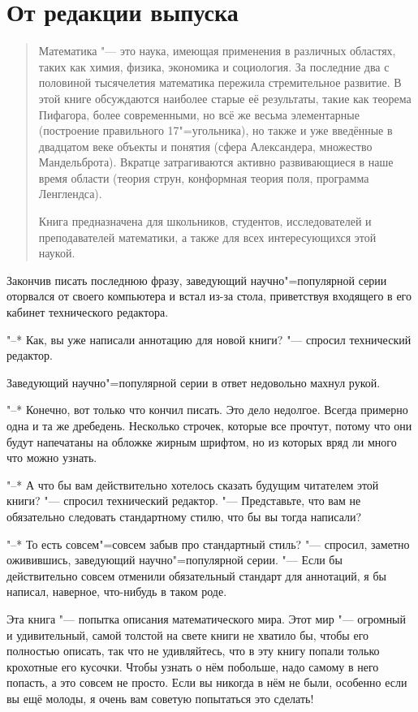 \chapter*{От редакции выпуска}

\begin{quotation}
Математика "--- это наука, имеющая применения в различных областях, таких как
химия, физика, экономика и социология.
За последние два с половиной тысячелетия математика пережила стремительное
развитие.
В этой книге обсуждаются наиболее старые её результаты, такие как теорема
Пифагора, более современными, но всё же весьма элементарные (построение
правильного 17"=угольника), но также и уже введённые в двадцатом веке объекты и
понятия (сфера Александера, множество Мандельброта).
Вкратце затрагиваются активно развивающиеся в наше время области (теория струн,
конформная теория поля, программа Ленглендса).

Книга предназначена для школьников, студентов, исследователей и преподавателей
математики, а также для всех интересующихся этой наукой.
\end{quotation}

Закончив писать последнюю фразу, заведующий научно"=популярной серии оторвался
от своего компьютера и встал из-за стола, приветствуя входящего в его кабинет
технического редактора.

"--* Как, вы уже написали аннотацию для новой книги? "--- спросил технический
редактор.

Заведующий научно"=популярной серии в ответ недовольно махнул рукой.

"--* Конечно, вот только что кончил писать.
Это дело недолгое.
Всегда примерно одна и та же дребедень.
Несколько строчек, которые все прочтут, потому что они будут напечатаны на
обложке жирным шрифтом, но из которых вряд ли много что можно узнать.

"--* А что бы вам действительно хотелось сказать будущим читателем этой книги?
"--- спросил технический редактор.
"--- Представьте, что вам не обязательно следовать стандартному стилю, что бы вы
тогда написали?

"--* То есть совсем"=совсем забыв про стандартный стиль? "--- спросил, заметно
оживившись, заведующий научно"=популярной серии.
"--- Если бы действительно совсем отменили обязательный стандарт для аннотаций,
я бы написал, наверное, что-нибудь в таком роде.

\medskip
Эта книга "--- попытка описания математического мира.
Этот мир "--- огромный и удивительный, самой толстой на свете книги не хватило
бы, чтобы его полностью описать, так что не удивляйтесь, что в эту книгу попали
только крохотные его кусочки.
Чтобы узнать о нём побольше, надо самому в него попасть, а это совсем не просто.
Если вы никогда в нём не были, особенно если вы ещё молоды, я очень вам советую
попытаться это сделать!


